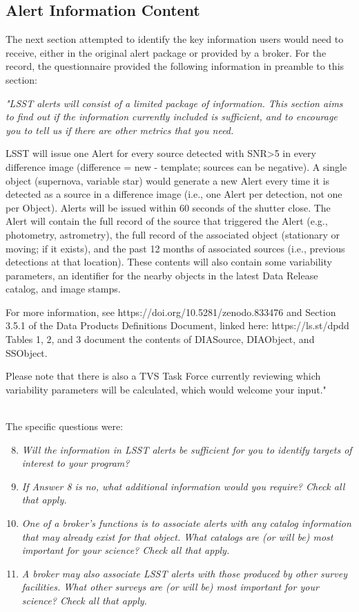 \documentclass{article}
\begin{document}
\subsection{Alert Information Content}
The next section attempted to identify the key information users would need to receive, either in the original alert package or provided by a broker.  For the record, the questionnaire provided the following information in preamble to this section:

{\em "LSST alerts will consist of a limited package of information.  This section aims to find out if the information currently included is sufficient, and to encourage you to tell us if there are other metrics that you need.

LSST will issue one Alert for every source detected with SNR>5 in every difference image (difference = new - template; sources can be negative). A single object (supernova, variable star) would generate a new Alert every time it is detected as a source in a difference image (i.e., one Alert per detection, not one per Object). Alerts will be issued within 60 seconds of the shutter close. The Alert will contain the full record of the source that triggered the Alert (e.g., photometry, astrometry), the full record of the associated object (stationary or moving; if it exists), and the past 12 months of associated sources (i.e., previous detections at that location). These contents will also contain some variability parameters, an identifier for the nearby objects in the latest Data Release catalog, and image stamps.

For more information, see https://doi.org/10.5281/zenodo.833476 and Section 3.5.1 of the Data Products Definitions Document, linked here: https://ls.st/dpdd Tables 1, 2, and 3 document the contents of DIASource, DIAObject, and SSObject.

Please note that there is also a TVS Task Force currently reviewing which variability parameters will be calculated, which would welcome your input."} \\

The specific questions were:
\begin{enumerate}
\setcounter{enumi}{7}
\item {\em Will the information in LSST alerts be sufficient for you to identify targets of interest to your program?}
\item {\em If Answer 8 is no, what additional information would you require? Check all that apply.}
\item {\em One of a broker’s functions is to associate alerts with any catalog information that may already exist for that object.  What catalogs are (or will be) most important for your science?  Check all that apply.}
\item {\em A broker may also associate LSST alerts with those produced by other survey facilities.  What other surveys are (or will be) most important for your science? Check all that apply.}
\end{enumerate}
\end{document}
